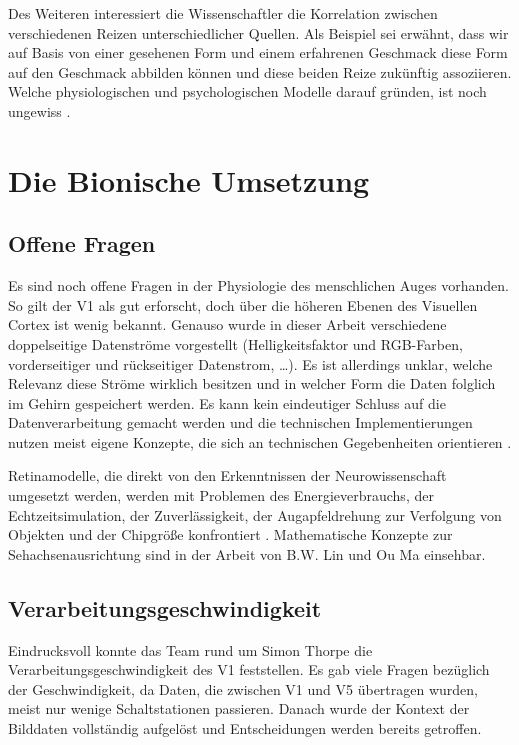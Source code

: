 \documentclass[12pt,a4paper]{article}
\begin{document}
Des Weiteren interessiert die Wissenschaftler die Korrelation zwischen
verschiedenen Reizen unterschiedlicher Quellen. Als Beispiel sei erwähnt,
dass wir auf Basis von einer gesehenen Form und einem erfahrenen Geschmack
diese Form auf den Geschmack abbilden können und diese beiden Reize
zukünftig assoziieren. Welche physiologischen und psychologischen Modelle
darauf gründen, ist noch ungewiss \cite{brainactivation}.

\section{Die Bionische Umsetzung}

\subsection{Offene Fragen}

Es sind noch offene Fragen in der Physiologie des menschlichen Auges vorhanden.
So gilt der V1 als gut erforscht, doch über die höheren Ebenen des Visuellen
Cortex ist wenig bekannt. Genauso wurde in dieser Arbeit verschiedene
doppelseitige Datenströme vorgestellt (Helligkeitsfaktor und RGB-Farben,
vorderseitiger und rückseitiger Datenstrom, \dots). Es ist allerdings unklar,
welche Relevanz diese Ströme wirklich besitzen und in welcher Form die Daten
folglich im Gehirn gespeichert werden. Es kann kein eindeutiger Schluss auf die
Datenverarbeitung gemacht werden und die technischen Implementierungen nutzen
meist eigene Konzepte, die sich an technischen Gegebenheiten orientieren
\cite{arch}.

Retinamodelle, die direkt von den Erkenntnissen der Neurowissenschaft umgesetzt
werden, werden mit Problemen des Energieverbrauchs, der Echtzeitsimulation,
der Zuverlässigkeit, der Augapfeldrehung zur Verfolgung von Objekten und der
Chipgröße konfrontiert \cite{retinapathways}. Mathematische Konzepte zur
Sehachsenausrichtung sind in der Arbeit von B.W. Lin und Ou Ma
\cite{modanalysis} einsehbar.

\subsection{Verarbeitungsgeschwindigkeit}

Eindrucksvoll konnte das Team rund um Simon Thorpe \cite{thorpe} die
Verarbeitungsgeschwindigkeit des V1 feststellen. Es gab viele Fragen bezüglich
der Geschwindigkeit, da Daten, die zwischen V1 und V5 übertragen wurden,
meist nur wenige Schaltstationen passieren. Danach wurde der Kontext der
Bilddaten vollständig aufgelöst und Entscheidungen werden bereits getroffen.
\end{document}
